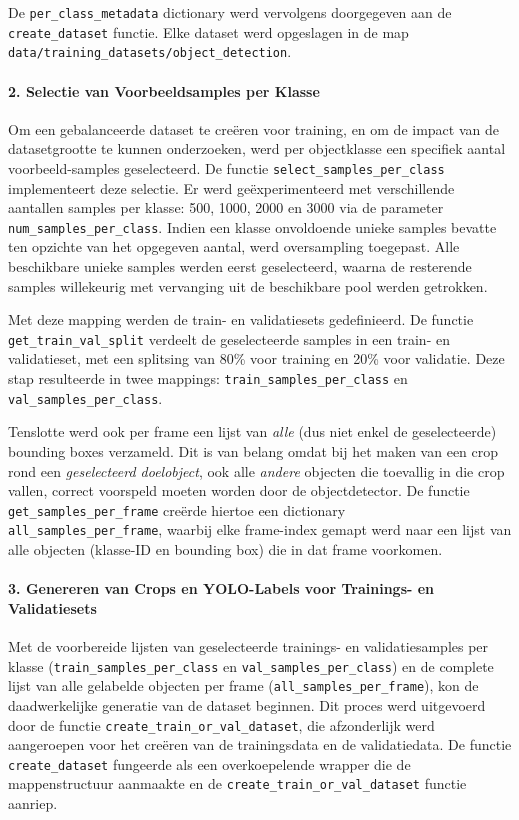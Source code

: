 De \texttt{per\_class\_metadata} dictionary werd vervolgens doorgegeven aan de\\ \texttt{create\_dataset} functie.
Elke dataset werd opgeslagen in de map\\ \texttt{data/training\_datasets/object\_detection}.

\paragraph{2. Selectie van Voorbeeldsamples per Klasse}
Om een gebalanceerde dataset te creëren voor training, en om de impact van de datasetgrootte te kunnen onderzoeken, 
werd per objectklasse een specifiek aantal voorbeeld-samples geselecteerd. 
De functie \texttt{select\_samples\_per\_class} implementeert deze selectie. 
Er werd geëxperimenteerd met verschillende aantallen samples per klasse: 500, 1000, 2000 en 3000 via de parameter \texttt{num\_samples\_per\-\_class}.
Indien een klasse onvoldoende unieke samples bevatte ten opzichte van het opgegeven aantal, werd oversampling toegepast.
Alle beschikbare unieke samples werden eerst geselecteerd, waarna de resterende samples willekeurig met vervanging uit de beschikbare pool werden getrokken.

Met deze mapping werden de train- en validatiesets gedefinieerd.
De functie\\ \texttt{get\_train\_val\_split} verdeelt de geselecteerde samples in een train- en validatieset,
met een splitsing van 80\% voor training en 20\% voor validatie.
Deze stap resulteerde in twee mappings: \texttt{train\_samples\_per\_class} en \texttt{val\_samples\_per\_class}.

Tenslotte werd ook per frame een lijst van \textit{alle} (dus niet enkel de geselecteerde) bounding boxes verzameld.
Dit is van belang omdat bij het maken van een crop rond een \textit{geselecteerd doelobject},
ook alle \textit{andere} objecten die toevallig in die crop vallen, correct voorspeld moeten worden door de objectdetector.
De functie \texttt{get\_samples\_per\_frame} creërde hiertoe een dictionary\\ \texttt{all\_samples\_per\_frame}, 
waarbij elke frame-index gemapt werd naar een lijst van alle objecten (klasse-ID en bounding box) die in dat frame voorkomen.

\paragraph{3. Genereren van Crops en YOLO-Labels voor Trainings- en Validatiesets}
Met de voorbereide lijsten van geselecteerde trainings- en validatiesamples per 
klasse (\texttt{train\_samples\_per\_class} en \texttt{val\_samples\_per\_class}) 
en de complete lijst van alle gelabelde objecten per frame (\texttt{all\_samples\_per\_frame}), 
kon de daadwerkelijke generatie van de dataset beginnen. 
Dit proces werd uitgevoerd door de functie \texttt{create\_train\_or\_val\_dataset}, 
die afzonderlijk werd aangeroepen voor het creëren van de trainingsdata en de validatiedata. 
De functie \texttt{create\_dataset} fungeerde als een overkoepelende wrapper die de mappenstructuur 
aanmaakte en de \texttt{create\_train\_or\_val\_dataset} functie aanriep.

